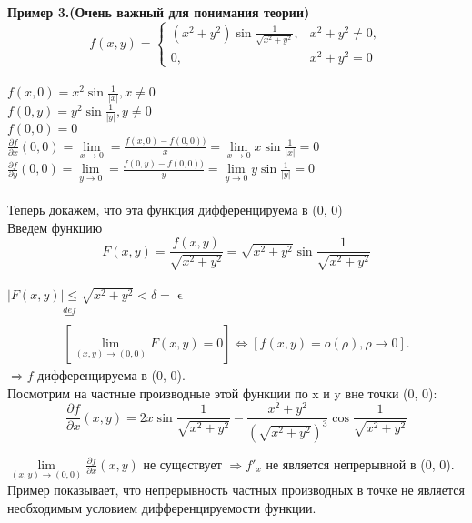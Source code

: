 \documentclass[a4paper,14pt]{article} %
\begin{document}
	 \textbf{Пример 3.(Очень важный для понимания теории)} 
	 \begin{equation*}
	 	f(x, y) = 
	 	\begin{cases}
	 		(x^2 + y^2)\sin{\frac{1}{\sqrt{x^2 + y^2}}}, & x^2 + y^2 \not=0,\\
	 		0, & x^2 + y^2 = 0
	 	\end{cases}
	 \end{equation*}\\
 	 $f(x, 0) = x^2\sin{\frac{1}{|x|}}, x \not =0$\\
	 $f(0, y) = y^2\sin{\frac{1}{|y|}}, y \not =0$\\ 	
	 $f(0,0) = 0$\\
	 $\frac{\partial f}{\partial x}(0, 0) = \lim\limits_{x \to 0} = \frac{f(x, 0) - f(0, 0))}{x} = \lim\limits_{x \to 0} x\sin{\frac{1}{|x|}} = 0$ \\
	 $\frac{\partial f}{\partial y}(0, 0) = \lim\limits_{y \to 0} = \frac{f(0, y) - f(0, 0))}{y} = \lim\limits_{y \to 0} y\sin{\frac{1}{|y|}} = 0$\\\\
	 Теперь докажем, что эта функция дифференцируема в (0, 0)\\
	 Введем функцию \[F(x, y) = \frac{f(x, y)}{\sqrt{x^2 + y^2}} = \sqrt{x^2 + y^2}\sin{\frac{1}{\sqrt{x^2 + y^2}}}\]\\
	 $|F(x, y)| \leq \sqrt{x^2 + y^2} < \delta = \upvarepsilon$
	 \begin{multline*}
	 [\forall\upvarepsilon > 0  \exists\delta = \delta(\upvarepsilon) = \upvarepsilon: \forall(x, y): 0 < \rho = \sqrt{x^2 + y^2} < \delta \mapsto |F(x, y)| < \upvarepsilon] \stackrel{def}{=} \\
	 [\lim\limits_{(x, y) \to (0, 0)} F(x, y) = 0] \Leftrightarrow [f(x, y) = o(\rho), \rho \to 0].
	 \end{multline*}
	 $\Rightarrow f$ дифференцируема в (0, 0).\\
	 
	 Посмотрим на частные производные этой функции по x и y вне точки (0, 0):\\

	 \[\frac{\partial f}{\partial x}(x, y) = 2x\sin{\frac{1}{\sqrt{x^2+y^2}}} -\frac{x^2+y^2}{(\sqrt{x^2+y^2})^3} \cos{\frac{1}{\sqrt{x^2+y^2}}}\]

	 $\lim\limits_{(x, y) \to (0, 0)} \frac{\partial f}{\partial x}(x, y)$ не существует $\Rightarrow f'_x$ не является непрерывной в (0, 0).\\
	 Пример показывает, что непрерывность частных производных в точке не является необходимым условием дифференцируемости функции.\\
	 
\end{document}
